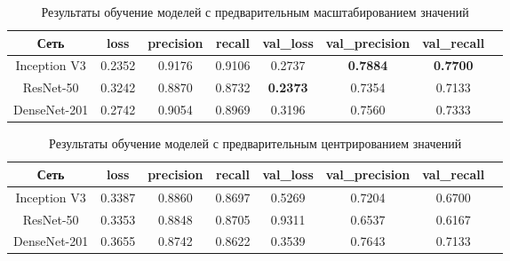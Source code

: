 \begin{table}[H]
    \centering
    \caption{Результаты обучение моделей с предварительным масштабированием значений} \label{rescale}
    \begin{tabular}{|c|c|c|c|c|c|c|c|}
        \hline    
        Сеть          & loss   & precision & recall & val\_loss & val\_precision & val\_recall \\ %
        \hline
        Inception V3  & 0.2352 & 0.9176    & 0.9106 & 0.2737   & \color{red}\textbf{0.7884}        & \color{red}\textbf{0.7700} \\ %
        \hline
        ResNet-50     & 0.3242 & 0.8870    & 0.8732 & \color{red}\textbf{0.2373}    & 0.7354         & 0.7133 \\ %
        \hline
        DenseNet-201  & 0.2742 & 0.9054    & 0.8969 & 0.3196    & 0.7560         & 0.7333 \\ %
        \hline
      \end{tabular}
\end{table}

\begin{table}[H]
    \centering
    \caption{Результаты обучение моделей с предварительным центрированием значений} \label{samplewise}    
    \begin{tabular}{|c|c|c|c|c|c|c|c|}
        \hline    
        Сеть          & loss   & precision & recall & val\_loss & val\_precision & val\_recall \\ %
        \hline
        Inception V3  & 0.3387 & 0.8860    & 0.8697 & 0.5269    & 0.7204         & 0.6700 \\ %
        \hline
        ResNet-50     & 0.3353  & 0.8848   & 0.8705 & 0.9311   & 0.6537        & 0.6167 \\ %
        \hline
        DenseNet-201  & 0.3655  & 0.8742   & 0.8622 & 0.3539   & 0.7643        & 0.7133 \\ %
        \hline
      \end{tabular}
\end{table}




